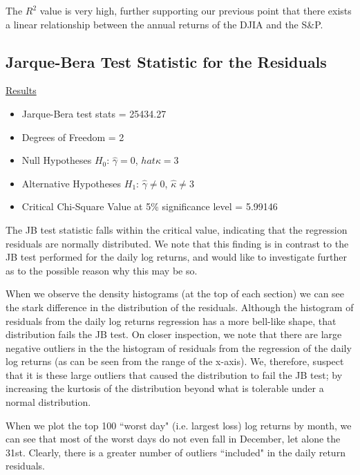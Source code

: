 \documentclass[a4paper]{article}
\begin{document}
     The $R^2$ value is very high, further supporting our previous point that there exists a linear relationship between the annual returns of the DJIA and the S\&P.
	
	\newpage
	\subsection{Jarque-Bera Test Statistic for the Residuals}
	\underline{Results}
	\begin{itemize}[nosep]
		\item Jarque-Bera test stats = 25434.27
		\item Degrees of Freedom = 2
		\item Null Hypotheses $H_0$: $\hat{\gamma} = 0$, $hat{\kappa} = 3$
		\item Alternative Hypotheses $H_1$: $\hat{\gamma} \ne 0$, $\hat{\kappa} \ne 3$
		\item Critical Chi-Square Value at 5\% significance level = 5.99146
	\end{itemize}
	
	The JB test statistic falls within the critical value, indicating that the regression residuals are normally distributed. We note that this finding is in contrast to the JB test performed for the daily log returns, and would like to investigate further as to the possible reason why this may be so.
	
	When we observe the density histograms (at the top of each section) we can see the stark difference in the distribution of the residuals. Although the histogram of residuals from the daily log returns regression has a more bell-like shape, that distribution fails the JB test. On closer inspection, we note that there are large negative outliers in the the histogram of residuals from the regression of the daily log returns (as can be seen from the range of the x-axis). We, therefore, suspect that it is these large outliers that caused the distribution to fail the JB test; by increasing the kurtosis of the distribution beyond what is tolerable under a normal distribution.
	
	When we plot the top 100 ``worst day" (i.e. largest loss) log returns by month, we can see that most of the worst days do not even fall in December, let alone the 31st. Clearly, there is a greater number of outliers ``included" in the daily return residuals. 
	
\end{document}
